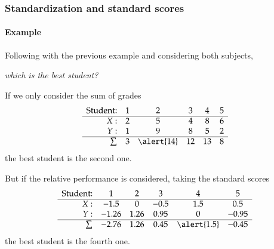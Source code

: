 \begin{frame}
\frametitle{Standardization and standard scores}
\framesubtitle{Example}
Following with the previous example and considering both subjects,
\begin{center}
\emph{which is the best student?}
\end{center}
If we only consider the sum of grades
\[
\begin{array}{rccccc}
\mbox{Student:} & 1 & 2 & 3 & 4 & 5\\ \hline
X: & 2 & 5 & 4 & 8 & 6 \\
Y: & 1 & 9 & 8 & 5 & 2 \\ \hline
\sum & 3 & \alert{14} & 12 & 13 & 8
\end{array}
\]
the best student is the second one. 

But if the relative performance is considered, taking the standard scores 
\[
\begin{array}{rccccc}
\mbox{Student:} & 1 & 2 & 3 & 4 & 5\\ \hline
X: & -1.5 & 0 & -0.5 & 1.5 & 0.5 \\
Y: & -1.26 & 1.26 & 0.95 & 0 & -0.95\\ \hline
\sum & -2.76 & 1.26 & 0.45 & \alert{1.5} & -0.45
\end{array}
\]
the best student is the fourth one. 
\end{frame}


